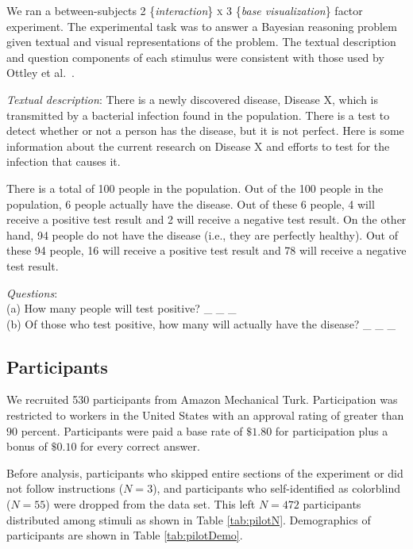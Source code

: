 We ran a between-subjects 2 \{\textit{interaction}\} \textsc{x} 3 \{\textit{base visualization}\} factor experiment. The experimental task was to answer a Bayesian reasoning problem given textual and visual representations of the problem. The textual description and question components of each stimulus were consistent with those used by Ottley et al.~\cite{ottley2016Bayesian}.
 
\begin{compacthang}
\item \textit{Textual description}: There is a newly discovered disease, Disease X, which is transmitted by a bacterial infection found in the population. There is a test to detect whether or not a person has the disease, but it is not perfect. Here is some information about the current research on Disease X and efforts to test for the infection that causes it.  
\smallskip 

There is a total of 100 people in the population. Out of the 100 people in the population, 6 people actually have the disease. Out of these 6 people, 4 will receive a positive test result and 2 will receive a negative test result. On the other hand, 94 people do not have the disease (i.e., they are perfectly healthy). Out of these 94 people, 16 will receive a positive test result and 78 will receive a negative test result.  
\item \textit{Questions}: \\
	(a) How many people will test positive? \_ \_ \_ \\
	(b) Of those who test positive, how many will actually have the disease? \_ \_ \_ 
\end{compacthang}

\subsection{Participants}
We recruited 530 participants from Amazon Mechanical Turk. Participation was restricted to workers in the United States with an approval rating of greater than $90$ percent. Participants were paid a base rate of $\$1.80$ for participation plus a bonus of $\$0.10$ for every correct answer. 

Before analysis, participants who skipped entire sections of the experiment or did not follow instructions ($N = 3$), and participants who self-identified as colorblind  ($N = 55$) were dropped from the data set. 
This left $N = 472$ participants distributed among stimuli as shown in Table \ref{tab:pilotN}. Demographics of participants are shown in Table \ref{tab:pilotDemo}. 

